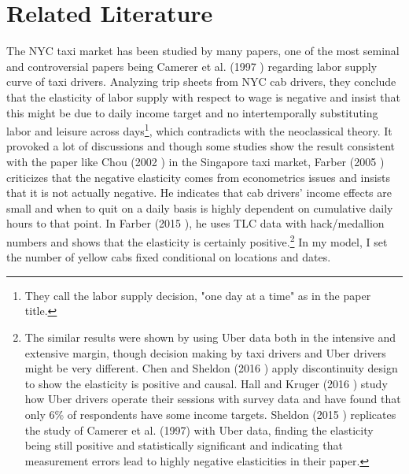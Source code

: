 \vspace{1.0cm}
\section{Related Literature}
\hspace{0.5cm} The NYC taxi market has been studied by many papers, one of the most seminal and controversial papers being Camerer et al. (1997 \cite{camerer1997labor}) regarding labor supply curve of taxi drivers. Analyzing trip sheets from NYC cab drivers, they conclude that the elasticity of labor supply with respect to wage is negative and insist that this might be due to daily income target and no intertemporally substituting labor and leisure across days\footnote{They call the labor supply decision, "one day at a time" as in the paper title.}, which contradicts with the neoclassical theory. It provoked a lot of discussions and though some studies show the result consistent with the paper like Chou (2002 \cite{chou2002testing}) in the Singapore taxi market, Farber (2005 \cite{farber2005tomorrow}) criticizes that the negative elasticity comes from econometrics issues and insists that it is not actually negative. He indicates that cab drivers’ income effects are small and when to quit on a daily basis is highly dependent on cumulative daily hours to that point. In Farber (2015 \cite{farber2015you}), he uses TLC data with hack/medallion numbers and shows that the elasticity is certainly positive.\footnote{The similar results were shown by using Uber data both in the intensive and extensive margin, though decision making by taxi drivers and Uber drivers might be very different. Chen and Sheldon (2016 \cite{chen2016dynamic}) apply discontinuity design to show the elasticity is positive and causal. Hall and Kruger (2016 \cite{hall2016analysis}) study how Uber drivers operate their sessions with survey data and have found that only 6\% of respondents have some income targets. Sheldon (2015 \cite{sheldon2015income}) replicates the study of Camerer et al. (1997) with Uber data, finding the elasticity being still positive and statistically significant and indicating that measurement errors lead to highly negative elasticities in their paper.}  In my model, I set the number of yellow cabs fixed conditional on locations and dates.

